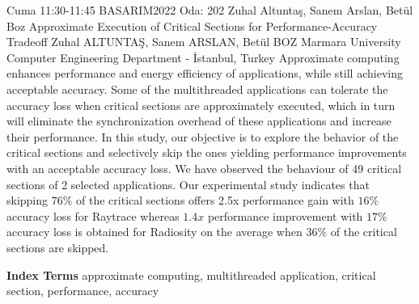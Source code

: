 
    \begin{abstract_basarim}
    {Cuma 11:30-11:45}
    {BASARIM2022}
    {Oda: 202}
    {Zuhal Altuntaş, Sanem Arslan, Betül Boz}
    {Approximate Execution of Critical Sections for Performance-Accuracy Tradeoff}
    {%
    Zuhal ALTUNTAŞ, Sanem ARSLAN, Betül BOZ}
    {%
    }
    {%
    Marmara University Computer Engineering Department - İstanbul, Turkey}
    Approximate computing enhances performance and energy efficiency of applications, while still achieving acceptable accuracy. Some of the multithreaded applications can tolerate the accuracy loss when critical sections are approximately executed, which in turn will eliminate the synchronization overhead of these applications and increase their performance. In this study, our objective is to explore the behavior of the critical sections and selectively skip the ones yielding performance improvements with an acceptable accuracy loss. We have observed the behaviour of 49 critical sections of 2 selected applications. Our experimental study indicates that skipping $76 \%$ of the critical sections offers 2.5x performance gain with $16 \%$ accuracy loss for Raytrace whereas $1.4 x$ performance improvement with $17 \%$ accuracy loss is obtained for Radiosity on the average when $36 \%$ of the critical sections are skipped. 
    
            \textbf{Index Terms} \newline{}approximate computing, multithreaded application, critical section, performance, accuracy
    \end{abstract_basarim}
    